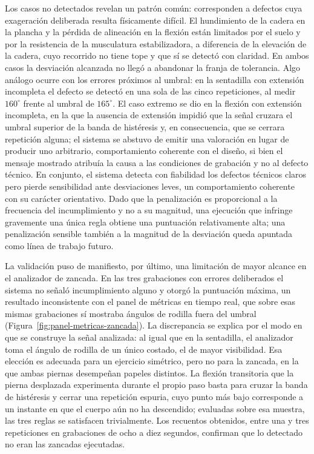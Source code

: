 \documentclass[12pt,a4paper,twoside,openright]{book}
\begin{document}
    Los casos no detectados revelan un patrón común: corresponden a defectos
    cuya exageración deliberada resulta físicamente difícil. El hundimiento de la
    cadera en la plancha y la pérdida de alineación en la flexión están limitados
    por el suelo y por la resistencia de la musculatura estabilizadora, a
    diferencia de la elevación de la cadera, cuyo recorrido no tiene tope y que
    sí se detectó con claridad. En ambos casos la desviación alcanzada no llegó a
    abandonar la franja de tolerancia. Algo análogo ocurre con los errores
    próximos al umbral: en la sentadilla con extensión incompleta el defecto se
    detectó en una sola de las cinco repeticiones, al medir $160^\circ$ frente al
    umbral de $165^\circ$. El caso extremo se dio en la flexión con extensión
    incompleta, en la que la ausencia de extensión impidió que la señal cruzara
    el umbral superior de la banda de histéresis y, en consecuencia, que se
    cerrara repetición alguna; el sistema se abstuvo de emitir una valoración en
    lugar de producir uno arbitrario, comportamiento coherente con el diseño,
    si bien el mensaje mostrado atribuía la causa a las condiciones de grabación
    y no al defecto técnico. En conjunto, el sistema detecta con fiabilidad los
    defectos técnicos claros pero pierde sensibilidad ante desviaciones leves, un
    comportamiento coherente con su carácter orientativo. Dado que la
    penalización es proporcional a la frecuencia del incumplimiento y no a su
    magnitud, una ejecución que infringe gravemente una única regla obtiene una
    puntuación relativamente alta; una penalización sensible también a la
    magnitud de la desviación queda apuntada como línea de trabajo futuro.

    La validación puso de manifiesto, por último, una limitación de mayor alcance
    en el analizador de zancada. En las tres grabaciones con errores deliberados
    el sistema no señaló incumplimiento alguno y otorgó la puntuación máxima, un
    resultado inconsistente con el panel de métricas en tiempo real, que sobre
    esas mismas grabaciones sí mostraba ángulos de rodilla fuera del umbral
    (Figura~\ref{fig:panel-metricas-zancada}). La discrepancia se explica por el
    modo en que se construye la señal analizada: al igual que en la sentadilla,
    el analizador toma el ángulo de rodilla de un único costado, el de mayor
    visibilidad. Esa elección es adecuada para un ejercicio simétrico, pero no
    para la zancada, en la que ambas piernas desempeñan papeles distintos. La
    flexión transitoria que la pierna desplazada experimenta durante el propio
    paso basta para cruzar la banda de histéresis y cerrar una repetición
    espuria, cuyo punto más bajo corresponde a un instante en que el cuerpo aún
    no ha descendido; evaluadas sobre esa muestra, las tres reglas se satisfacen
    trivialmente. Los recuentos obtenidos, entre una y tres repeticiones en
    grabaciones de ocho a diez segundos, confirman que lo detectado no eran las
    zancadas ejecutadas.
\end{document}

